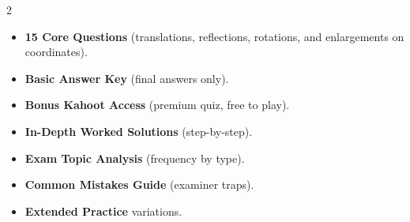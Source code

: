 \documentclass[11pt,a4paper]{article}
\newcommand{\FullReleaseDate}{April 30, 2026}
\begin{document}
\vspace{8pt}

\begin{multicols}{2}
  \begin{tcolorbox}[card, title=\sffamily\bfseries\textcolor{white}{\faHandPointDown\ TODAY (Simplified Version)}, colbacktitle=mainblue, boxed title style={sharp corners, boxrule=0pt}]
    \begin{itemize}[leftmargin=1.2em, itemsep=2pt]
      \item \small \textbf{15 Core Questions} (translations, reflections, rotations, and enlargements on coordinates).
      \item \small \textbf{Basic Answer Key} (final answers only).
      \item \small \textbf{Bonus Kahoot Access} (premium quiz, free to play).
    \end{itemize}
  \end{tcolorbox}

  \columnbreak

  \begin{tcolorbox}[card, title=\sffamily\bfseries\textcolor{white}{\faRocket\ ON \FullReleaseDate\ (Full Upgrade)}, colbacktitle=mainblue, boxed title style={sharp corners, boxrule=0pt}]
    \begin{itemize}[leftmargin=1.2em, itemsep=2pt]
      \item \small \textbf{In-Depth Worked Solutions} (step-by-step).
      \item \small \textbf{Exam Topic Analysis} (frequency by type).
      \item \small \textbf{Common Mistakes Guide} (examiner traps).
      \item \small \textbf{Extended Practice} variations.
    \end{itemize}
  \end{tcolorbox}
\end{multicols}
\end{document}
